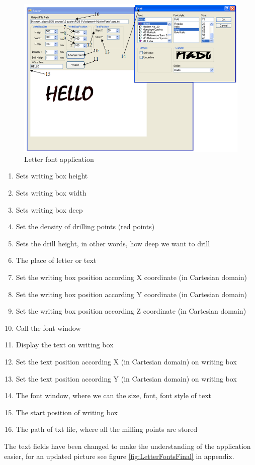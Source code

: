 \begin{figure}[H]
  \centering
  \includegraphics[scale= 0.8]{source/letterapp.png}
  \caption{Letter font application}
  \label{fig:letterapp}
\end{figure}

\begin{enumerate}
\item Sets writing box height
\item Sets writing box width
\item Sets writing box deep
\item Set the density of drilling points (red points)
\item Sets the drill height, in other words, how deep we want to drill
\item The place of letter or text
\item Set the writing box position according X coordinate (in Cartesian domain)
\item Set the writing box position according Y coordinate (in Cartesian domain)
\item Set the writing box position according Z coordinate (in Cartesian domain) 
\item Call the font window
\item Display the text on writing box
\item Set the text position according X (in Cartesian domain) on writing box
\item Set the text position according Y (in Cartesian domain) on writing box
\item The font window, where we can the size, font, font style of text
\item The start position of writing box
\item The path of txt file, where all the milling points are stored
\end{enumerate}
The text fields have been changed to make the understanding of the application easier, for an updated picture see figure \ref{fig:LetterFontsFinal} in appendix.

